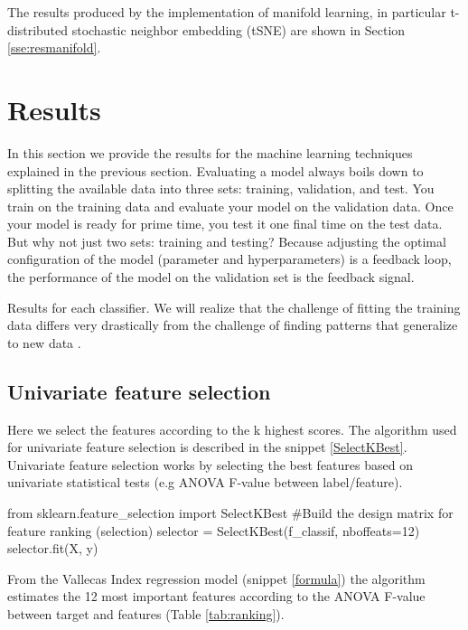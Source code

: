 \documentclass[11pt]{article}
\theoremstyle{definition}
\theoremstyle{remark}
\begin{document}
{The results produced by the implementation of manifold learning, in particular t-distributed stochastic neighbor embedding (tSNE) are shown in Section \ref{sse:resmanifold}.


\newpage

\section{Results}
\label{se:res}

In this section we provide the results for the machine learning techniques explained in the previous section.
Evaluating a model always boils down to splitting the available data into three sets: training, validation, and test. You train on the training data and evaluate your model on the validation data. Once your model is ready for prime time, you test it one final time on the test data. 
But why not just two sets: training and testing? Because adjusting the optimal configuration of the model (parameter and hyperparameters) is a feedback loop, the performance of the model on the validation set is the feedback signal.

Results for each classifier. We will realize that the challenge of fitting the training data differs very drastically from the challenge of finding patterns that generalize to new data \cite{goodfellow2016deep}.

\subsection{Univariate feature selection}
\label{se:reslinreg}

Here we select the features according to the k highest scores. The algorithm used for univariate feature selection is described in the snippet \ref{SelectKBest}. Univariate feature selection works by selecting the best features based on univariate statistical tests (e.g ANOVA F-value between label/feature).

\begin{code}[caption=SelectKBest, label=SelectKBest]
from sklearn.feature_selection import SelectKBest
#Build the design matrix for feature ranking (selection)
selector = SelectKBest(f_classif, nboffeats=12)
selector.fit(X, y)
\end{code}

From the Vallecas Index regression model (snippet \ref{formula}) the algorithm estimates the 12 most important features according to the ANOVA F-value between target and features (Table \ref{tab:ranking}).

}
\end{document}
